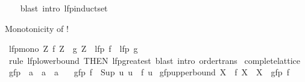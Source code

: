 \begin{isabellebody}
%
\isadelimproof
\ \ %
\endisadelimproof
%
\isatagproof
{}\isamarkupfalse%
\ {\isacharparenleft}{\kern0pt}blast\ intro{\isacharcolon}{\kern0pt}\ lfp{\isacharunderscore}{\kern0pt}induct{\isacharunderscore}{\kern0pt}set{\isacharparenright}{\kern0pt}%
\endisatagproof
{\isafoldproof}%
%
\isadelimproof
%
\endisadelimproof
%
\begin{isamarkuptext}%
Monotonicity of !%
\end{isamarkuptext}\isamarkuptrue%
\isamarkupfalse%
\ lfp{\isacharunderscore}{\kern0pt}mono{\isacharcolon}{\kern0pt}\ {\isachardoublequoteopen}{\isacharparenleft}{\kern0pt}{\isasymAnd}Z{\isachardot}{\kern0pt}\ f\ Z\ {\isasymle}\ g\ Z{\isacharparenright}{\kern0pt}\ {\isasymLongrightarrow}\ lfp\ f\ {\isasymle}\ lfp\ g{\isachardoublequoteclose}\isanewline
%
\isadelimproof
\ \ %
\endisadelimproof
%
\isatagproof
{}\isamarkupfalse%
\ {\isacharparenleft}{\kern0pt}rule\ lfp{\isacharunderscore}{\kern0pt}lowerbound\ {\isacharbrackleft}{\kern0pt}THEN\ lfp{\isacharunderscore}{\kern0pt}greatest{\isacharbrackright}{\kern0pt}{\isacharparenright}{\kern0pt}\ {\isacharparenleft}{\kern0pt}blast\ intro{\isacharcolon}{\kern0pt}\ order{\isacharunderscore}{\kern0pt}trans{\isacharparenright}{\kern0pt}%
\endisatagproof
{\isafoldproof}%
%
\isadelimproof
%
\endisadelimproof
%
\isadelimdocument
%
\endisadelimdocument
%
\isatagdocument
%
\isamarkuptrue%
%
\endisatagdocument
{\isafolddocument}%
%
\isadelimdocument
%
\endisadelimdocument
{}\isamarkupfalse%
\ complete{\isacharunderscore}{\kern0pt}lattice\isanewline
{}\isanewline
\isanewline
{}\isamarkupfalse%
\ gfp\ {\isacharcolon}{\kern0pt}{\isacharcolon}{\kern0pt}\ {\isachardoublequoteopen}{\isacharparenleft}{\kern0pt}{\isacharprime}{\kern0pt}a\ {\isasymRightarrow}\ {\isacharprime}{\kern0pt}a{\isacharparenright}{\kern0pt}\ {\isasymRightarrow}\ {\isacharprime}{\kern0pt}a{\isachardoublequoteclose}\isanewline
\ \ \ {\isachardoublequoteopen}gfp\ f\ {\isacharequal}{\kern0pt}\ Sup\ {\isacharbraceleft}{\kern0pt}u{\isachardot}{\kern0pt}\ u\ {\isasymle}\ f\ u{\isacharbraceright}{\kern0pt}{\isachardoublequoteclose}\isanewline
\isanewline
{}\isamarkupfalse%
\ gfp{\isacharunderscore}{\kern0pt}upperbound{\isacharcolon}{\kern0pt}\ {\isachardoublequoteopen}X\ {\isasymle}\ f\ X\ {\isasymLongrightarrow}\ X\ {\isasymle}\ gfp\ f{\isachardoublequoteclose}\isanewline
%
\isadelimproof
\ \ %
\endisadelimproof
%
\isatagproof
{}\isamarkupfalse%

\end{isabellebody}
